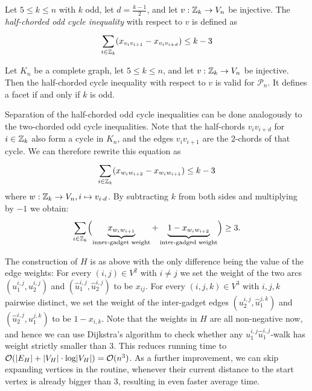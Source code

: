 \begin{definition}\label{def:half-chorded}
	Let $5 \leq k \leq n$ with $k$ odd, let $d = \frac{k-1}{2}$, and let $v: \mathbb{Z}_{k} \to V_{n}$ be injective.
	The \textit{half-chorded odd cycle inequality} with respect to $v$ is defined as
	\begin{equation}\label{eq:half-chorded}
		\sum_{i \in \mathbb{Z}_{k}}^{} (x_{v_{i} v_{i+1}} - x_{v_{i} v_{i+d} }) \leq k - 3
	\end{equation}
\end{definition}
\begin{theorem}
	Let $K_{n}$ be a complete graph, let $5 \leq k \leq n$, and let $v: \mathbb{Z}_{k} \to V_{n}$ be injective.
	Then the half-chorded cycle inequality with respect to $v$ is valid for $\mathscr{P}_{n}$.
	It defines a facet if and only if $k$ is odd.
\end{theorem}
Separation of the half-chorded odd cycle inequalities can be done analogously to the two-chorded odd cycle inequalities. 
Note that the half-chords $v_{i}v_{i+d}$ for $i \in \mathbb{Z}_{k}$ also form a cycle in $K_{n}$, and the edges $v_{i}v_{i+1}$ are the $2$-chords of that cycle.
We can therefore rewrite this equation as
\begin{equation*}
\sum_{i \in \mathbb{Z}_{k}}^{} (x_{w_{i}w_{i+2}} - x_{w_{i}w_{i+1}}) \leq k-3
\end{equation*}
where $w: \mathbb{Z}_{k} \to V_{n}, i \mapsto v_{i \cdot d}$.
By subtracting $k$ from both sides and multiplying by $-1$ we obtain:
\begin{equation*}
	\sum_{i \in \mathbb{Z}_{k}}^{} \Bigl( \underbrace{x_{w_{i}w_{i+1}}}_{\text{inner-gadget weight}} + \underbrace{1 -x_{w_{i}w_{i+2}}}_{\text{inter-gadged weight}} \Bigr) \geq 3.
\end{equation*}

The construction of $H$ is as above with the only difference being the value of the edge weights:
For every $(i,j) \in V^{2}$ with $i \neq j$ we set the weight of the two arcs $(u_{1}^{i,j},u_{2}^{i,j})$ and $(\hat{u}_{1}^{i,j},\hat{u}_{2}^{i,j})$ to be $x_{ij}$.
For every $(i,j,k) \in V^{3}$ with $i,j,k$ pairwise distinct, we set the weight of the inter-gadget edges $(u_{2}^{i,j},\hat{u}_{1}^{j,k})$ and $(\hat{u}_{2}^{i,j}, u_{1}^{j,k})$ to be $1 - x_{i,k}$.
Note that the weights in $H$ are all non-negative now, and hence we can use Dijkstra’s algorithm to check whether any $u_{1}^{i,j}\hat{u}_{1}^{i,j}$-walk has weight strictly smaller than $3$.
This reduces running time to $\mathcal{O}(\lvert E_{H} \rvert + \lvert V_{H} \rvert \cdot\operatorname{\text{log}} \lvert V_{H} \rvert) = \mathcal{O}(n^{3})$.
As a further improvement, we can skip expanding vertices in the routine, whenever their current distance to the start vertex is already bigger than $3$, resulting in even faster average time.

